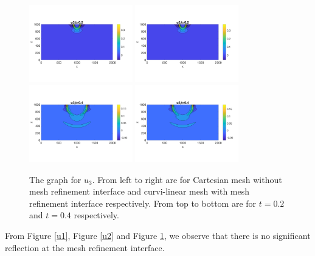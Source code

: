 \begin{figure}[htbp]
	\centering
	\includegraphics[width=0.4\textwidth,trim={0 2.8cm 0 2.8cm}, clip]{u3_t02_cartesian.png}
	\includegraphics[width=0.4\textwidth,trim={0 2.8cm 0 2.8cm}, clip]{u3_t02_curvi_mr.png}\\
	\includegraphics[width=0.4\textwidth,trim={0 2.8cm 0 2.8cm}, clip]{u3_t04_cartesian.png}
	\includegraphics[width=0.4\textwidth,trim={0 2.8cm 0 2.8cm}, clip]{u3_t04_curvi_mr.png}
	\caption{The graph for $u_3$. From left to right are for Cartesian mesh without mesh refinement interface and curvi-linear mesh with mesh refinement interface respectively. From top to bottom are for $t = 0.2$ and $t = 0.4$ respectively.}\label{u3}
\end{figure}
From Figure \ref{u1}, Figure \ref{u2} and Figure \ref{u3}, we observe that there is no significant reflection at the mesh refinement interface.